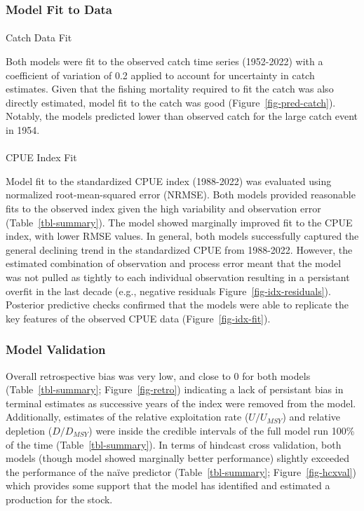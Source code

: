\documentclass[
  11pt,
]{SCreport}
\makeatletter
\let\oldparagraph\paragraph
\renewcommand{\paragraph}{
    \@ifstar
      \xxxParagraphStar
      \xxxParagraphNoStar
  }
\newcommand{\xxxParagraphStar}[1]{\oldparagraph*{#1}\mbox{}}
\newcommand{\xxxParagraphNoStar}[1]{\oldparagraph{#1}\mbox{}}
\makeatother
\begin{document}
\subsubsection{Model Fit to Data}\label{sec-model-fit}

\paragraph{Catch Data Fit}\label{catch-data-fit}

Both models were fit to the observed catch time series (1952-2022) with
a coefficient of variation of 0.2 applied to account for uncertainty in
catch estimates. Given that the fishing mortality required to fit the
catch was also directly estimated, model fit to the catch was good
(Figure~\ref{fig-pred-catch}). Notably, the models predicted lower than
observed catch for the large catch event in 1954.

\paragraph{CPUE Index Fit}\label{cpue-index-fit}

Model fit to the standardized CPUE index (1988-2022) was evaluated using
normalized root-mean-squared error (NRMSE). Both models provided
reasonable fits to the observed index given the high variability and
observation error (Table~\ref{tbl-summary}). The
 model showed marginally improved fit
to the CPUE index, with lower RMSE values. In general, both models
successfully captured the general declining trend in the standardized
CPUE from 1988-2022. However, the estimated combination of observation
and process error meant that the model was not pulled as tightly to each
individual observation resulting in a persistant overfit in the last
decade (e.g., negative residuals Figure~\ref{fig-idx-residuals}).
Posterior predictive checks confirmed that the models were able to
replicate the key features of the observed CPUE data
(Figure~\ref{fig-idx-fit}).

\subsubsection{Model Validation}\label{sec-model-validation}

Overall retrospective bias was very low, and close to 0 for both models
(Table~\ref{tbl-summary}; Figure~\ref{fig-retro}) indicating a lack of
persistant bias in terminal estimates as successive years of the index
were removed from the model. Additionally, estimates of the relative
exploitation rate (\(U/U_{MSY}\)) and relative depletion (\(D/D_{MSY}\))
were inside the credible intervals of the full model run 100\% of the
time (Table~\ref{tbl-summary}). In terms of hindcast cross validation,
both models (though  model showed
marginally better performance) slightly exceeded the performance of the
naïve predictor (Table~\ref{tbl-summary}; Figure~\ref{fig-hcxval}) which
provides some support that the model has identified and estimated a
production for the stock.
\end{document}
